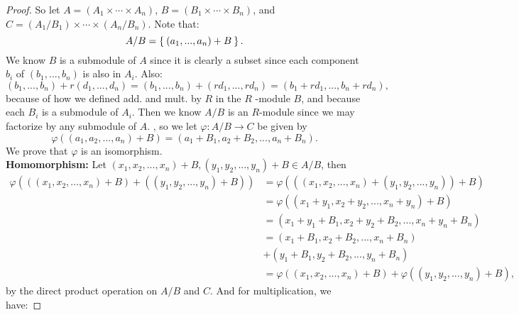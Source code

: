 \documentclass[12pt]{amsbook}
\theoremstyle{plain}
\numberwithin{section}{chapter}
\numberwithin{equation}{chapter}
\theoremstyle{definition}
\theoremstyle{remark}
\renewcommand{\phi}{\varphi}
\begin{document}
\begin{enumerate}[label=\arabic*.]
\begin{proof}
So let $A = (A_1 \times \cdots \times A_n)$, $B = (B_1 \times \cdots \times B_n)$, and $C = (A_1/B_1) \times \cdots \times (A_n/B_n)$. Note that: 
$$
A/B = \Set{(a_1,...,a_n) + B}.
$$
We know $B$ is a submodule of $A$ since it is clearly a subset since each component $b_i$ of $(b_1,...,b_n)$ is also in $A_i$. Also: 
$$
(b_1,...,b_n) + r(d_1,...,d_n) = (b_1,...,b_n) + (rd_1,...,rd_n) = (b_1 + rd_1,...,b_n + rd_n),
$$
because of how we defined add. and mult. by $R$ in the $R$ -module $B$, and because each $B_i$ is a submodule of $A_i$. 
Then we know $A/B$ is an $R$-module since we may factorize by any submodule of $A$. , so we let $\phi: A/B \rightarrow C$ be given by $$\phi((a_1,a_2,...,a_n) + B) = (a_1+B_1,a_2+B_2,...,a_n+B_n).$$ 
We prove that $\phi$ is an isomorphism.\\
\textbf{Homomorphism: } Let $(x_1,x_2,...,x_n) + B,(y_1,y_2,...,y_n) + B \in A/B$, then 
\begin{equation}
\begin{aligned}
	\phi(((x_1,x_2,...,x_n) + B)
	+((y_1,y_2,...,y_n) + B)) 
	&= \phi(((x_1,x_2,...,x_n)
	+(y_1,y_2,...,y_n)) + B)\\ 
	&= \phi((x_1+y_1,x_2+y_2,...,x_n+y_n) + B) \\
	&= (x_1+y_1+B_1,x_2+y_2+B_2,...,x_n+y_n+B_n)\\
 	&= (x_1+B_1,x_2+B_2,...,x_n+B_n)\\
 	&+(y_1+B_1,y_2+B_2,...,y_n+B_n)\\
  	&= \phi((x_1,x_2,...,x_n) + B)+\phi((y_1,y_2,...,y_n) + B), 
\end{aligned}
\end{equation}
by the direct product operation on $A/B$ and $C$. And for multiplication, we have: 


\end{proof}
\end{enumerate}
\end{document}
